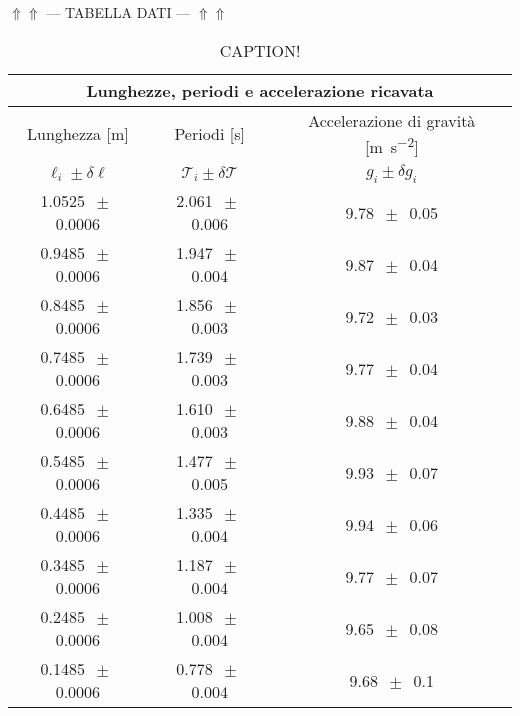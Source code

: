 \begin{center}
$\Uparrow\Uparrow$ --- TABELLA DATI --- $\Uparrow\Uparrow$
\end{center}

\begin{table}
    \centering
    \begin{tabular}{c c c}
        \multicolumn{3}{c}{\textbf{Lunghezze, periodi e accelerazione ricavata}} \\
        \toprule
        Lunghezza [\si{\metre}] & Periodi [\si{\second}] & Accelerazione di gravità [\si{\metre\per\square\second}] \\
        $\ell_i \pm \delta\ell$ & $\mathcal{T}_i \pm \delta\mathcal{T}$ & $g_i \pm \delta g_i$ \\
        \midrule
		1.0525 $\,\pm\,$ 0.0006 & 2.061 $\,\pm\,$ 0.006 & 9.78 $\,\pm\,$ 0.05 \\
		0.9485 $\,\pm\,$ 0.0006 & 1.947 $\,\pm\,$ 0.004 & 9.87 $\,\pm\,$ 0.04 \\
		0.8485 $\,\pm\,$ 0.0006 & 1.856 $\,\pm\,$ 0.003 & 9.72 $\,\pm\,$ 0.03 \\
		0.7485 $\,\pm\,$ 0.0006 & 1.739 $\,\pm\,$ 0.003 & 9.77 $\,\pm\,$ 0.04 \\
		0.6485 $\,\pm\,$ 0.0006 & 1.610 $\,\pm\,$ 0.003 & 9.88 $\,\pm\,$ 0.04 \\
		0.5485 $\,\pm\,$ 0.0006 & 1.477 $\,\pm\,$ 0.005 & 9.93 $\,\pm\,$ 0.07 \\
		0.4485 $\,\pm\,$ 0.0006 & 1.335 $\,\pm\,$ 0.004 & 9.94 $\,\pm\,$ 0.06 \\
		0.3485 $\,\pm\,$ 0.0006 & 1.187 $\,\pm\,$ 0.004 & 9.77 $\,\pm\,$ 0.07 \\
		0.2485 $\,\pm\,$ 0.0006 & 1.008 $\,\pm\,$ 0.004 & 9.65 $\,\pm\,$ 0.08 \\
		0.1485 $\,\pm\,$ 0.0006 & 0.778 $\,\pm\,$ 0.004 & 9.68 $\,\pm\,$ 0.1 \\
        \bottomrule
    \end{tabular}
    \caption{CAPTION!}
    \label{tab:calcolo_g}
\end{table}


